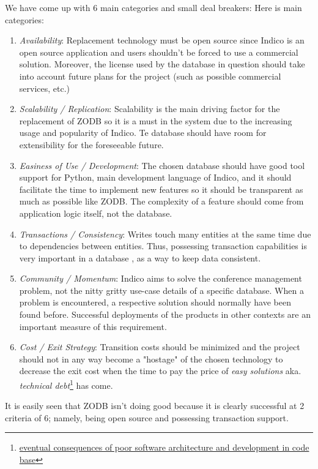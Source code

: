 We have come up with 6 main categories and small deal breakers: Here is main categories:

\begin{enumerate}
  \item \textit{Availability}: Replacement technology must be open source since Indico is an open source application and users shouldn't be forced to use a commercial solution. Moreover, the license used by the database in question should take into account future plans for the project (such as possible commercial services, etc.)
  \item \textit{Scalability / Replication}: Scalability is the main driving factor for the replacement of \textsc{ZODB} so it is a must in the system due to the increasing usage and popularity of Indico. Te database should have room for extensibility for the foreseeable future.
  \item \textit{Easiness of Use / Development}: The chosen database should have good tool support for Python, main development language of Indico, and it should facilitate the time to implement new features so it should be transparent as much as possible like \textsc{ZODB}. The complexity of a feature should come from application logic itself, not the database.
  \item \textit{Transactions / Consistency}: Writes touch many entities at the same time due to dependencies between entities. Thus, possessing transaction capabilities is very important in a database , as a way to keep data consistent.
  \item \textit{Community / Momentum}: Indico aims to solve the conference management problem, not the nitty gritty use-case details of a specific database. When a problem is encountered, a respective solution should normally have been found before. Successful deployments of the products in other contexts are an important measure of this requirement.
  \item \textit{Cost / Exit Strategy}: Transition costs should be minimized and the project should not in any way become a "hostage" of the chosen technology to decrease the exit cost when the time to pay the price of \textit{easy solutions} aka. \textit{technical debt}\footnote{\href{http://en.wikipedia.org/wiki/Technical_debt}{eventual consequences of poor software architecture and development in code base}} has come.\cite{techdebt}\cite{techdebt-2}\cite{techdebt-3}
\end{enumerate}

It is easily seen that \textsc{ZODB} isn't doing good because it is clearly successful at 2 criteria of 6; namely, being open source and possessing transaction support.
